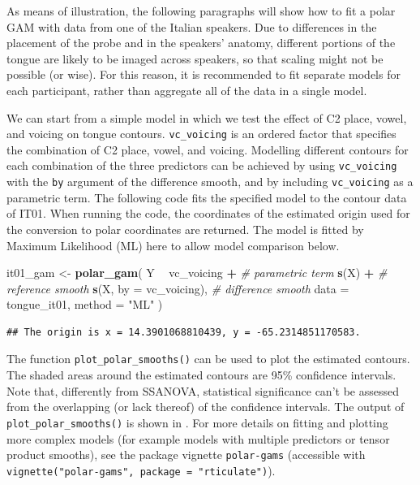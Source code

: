 \documentclass[11pt,]{article}
\newenvironment{Shaded}{\begin{snugshade}}{\end{snugshade}}
\newcommand{\CommentTok}[1]{\textcolor[rgb]{0.56,0.35,0.01}{\textit{#1}}}
\newcommand{\DataTypeTok}[1]{\textcolor[rgb]{0.13,0.29,0.53}{#1}}
\newcommand{\KeywordTok}[1]{\textcolor[rgb]{0.13,0.29,0.53}{\textbf{#1}}}
\newcommand{\NormalTok}[1]{#1}
\newcommand{\OperatorTok}[1]{\textcolor[rgb]{0.81,0.36,0.00}{\textbf{#1}}}
\newcommand{\StringTok}[1]{\textcolor[rgb]{0.31,0.60,0.02}{#1}}
\begin{document}
As means of illustration, the following paragraphs will show how to fit
a polar GAM with data from one of the Italian speakers. Due to
differences in the placement of the probe and in the speakers' anatomy,
different portions of the tongue are likely to be imaged across
speakers, so that scaling might not be possible (or wise). For this
reason, it is recommended to fit separate models for each participant,
rather than aggregate all of the data in a single model.

We can start from a simple model in which we test the effect of C2
place, vowel, and voicing on tongue contours. \texttt{vc\_voicing} is an
ordered factor that specifies the combination of C2 place, vowel, and
voicing. Modelling different contours for each combination of the three
predictors can be achieved by using \texttt{vc\_voicing} with the
\texttt{by} argument of the difference smooth, and by including
\texttt{vc\_voicing} as a parametric term. The following code fits the
specified model to the contour data of IT01. When running the code, the
coordinates of the estimated origin used for the conversion to polar
coordinates are returned. The model is fitted by Maximum Likelihood (ML)
here to allow model comparison below.

\begin{Shaded}
\begin{Highlighting}[]
\NormalTok{it01_gam <-}\StringTok{ }\KeywordTok{polar_gam}\NormalTok{(}
\NormalTok{  Y }\OperatorTok{~}
\StringTok{    }\NormalTok{vc_voicing }\OperatorTok{+}\StringTok{            }\CommentTok{# parametric term}
\StringTok{    }\KeywordTok{s}\NormalTok{(X) }\OperatorTok{+}\StringTok{                  }\CommentTok{# reference smooth}
\StringTok{    }\KeywordTok{s}\NormalTok{(X, }\DataTypeTok{by =}\NormalTok{ vc_voicing),  }\CommentTok{# difference smooth}
  \DataTypeTok{data =}\NormalTok{ tongue_it01,}
  \DataTypeTok{method =} \StringTok{"ML"}
\NormalTok{)}
\end{Highlighting}
\end{Shaded}

\begin{verbatim}
## The origin is x = 14.3901068810439, y = -65.2314851170583.
\end{verbatim}

The function \texttt{plot\_polar\_smooths()} can be used to plot the
estimated contours. The shaded areas around the estimated contours are
95\% confidence intervals. Note that, differently from SSANOVA,
statistical significance can't be assessed from the overlapping (or lack
thereof) of the confidence intervals. The output of
\texttt{plot\_polar\_smooths()} is shown in . For more
details on fitting and plotting more complex models (for example models
with multiple predictors or tensor product smooths), see the package
vignette \texttt{polar-gams} (accessible with
\texttt{vignette("polar-gams",\ package\ =\ "rticulate")}).
\end{document}
